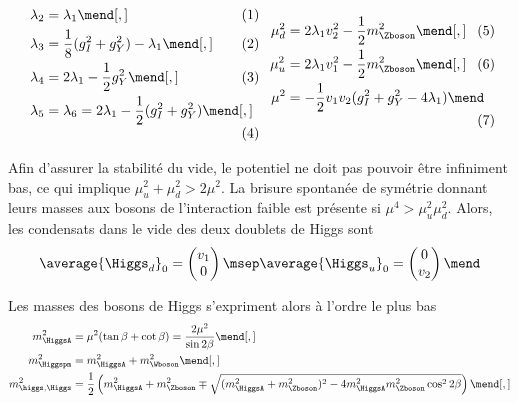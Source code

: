 \begin{subequations}
\noindent
\begin{minipage}[c]{.49\textwidth}
\begin{align}
\lambda_2 &= \lambda_1 \mend[,]\\
\lambda_3 &= \frac{1}{8} (g_I^2+g_Y^2)-\lambda_1 \mend[,]\\
\lambda_4 &= 2\lambda_1 - \frac{1}{2} g_Y^2 \mend[,]\\
\lambda_5 &= \lambda_6 = 2\lambda_1 - \frac{1}{2}(g_I^2+g_Y^2) \mend[,]
\end{align}
\end{minipage}
\hfill
\begin{minipage}[c]{.49\textwidth}
\begin{align}
\mu_d^2 &= 2 \lambda_1 v_2^2 - \frac{1}{2} m_{\Zboson}^2 \mend[,]\\
\mu_u^2 &= 2 \lambda_1 v_1^2 - \frac{1}{2} m_{\Zboson}^2 \mend[,]\\
\mu^2 &= -\frac{1}{2}v_1v_2(g_I^2+g_Y^2-4\lambda_1)
\mend
\end{align}
\end{minipage}
\end{subequations}
\vspace{.5\baselineskip}\par\noindent
Afin d'assurer la stabilité du vide, le potentiel ne doit pas pouvoir être infiniment bas, ce qui implique $\mu_u^2+\mu_d^2 > 2\mu^2$.
La brisure spontanée de symétrie donnant leurs masses aux bosons de l'interaction faible est présente si $\mu^4>\mu_u^2 \mu_d^2$.
Alors, les condensats dans le vide des deux doublets de Higgs sont
\begin{equation}
\average{\Higgs_d}_0 = \begin{pmatrix}v_1 \\ 0 \end{pmatrix}
\msep
\average{\Higgs_u}_0 = \begin{pmatrix} 0\\ v_2 \end{pmatrix}
\mend
\end{equation}
\par Les masses des bosons de Higgs s'expriment alors à l'ordre le plus bas
\begin{align}
m_{\HiggsA}^2 &= \mu^2 (\tan\beta+\cot\beta) = \frac{2\mu^2}{\sin 2\beta}
\mend[,] \label{eq-mA-MSSM}\\
m_{\Higgspm}^2 &= m_{\HiggsA}^2+m_{\Wboson}^2
\mend[,] \label{eq-mHpm-MSSM}\\
m_{\higgs,\Higgs}^2 &= \frac{1}{2} \left( m_{\HiggsA}^2+m_{\Zboson}^2 \mp \sqrt{(m_{\HiggsA}^2+m_{\Zboson}^2)^2-4m_{\HiggsA}^2m_{\Zboson}^2\cos^2 2\beta} \right)
\mend[,] \label{eq-mH0-MSSM}
\end{align}
